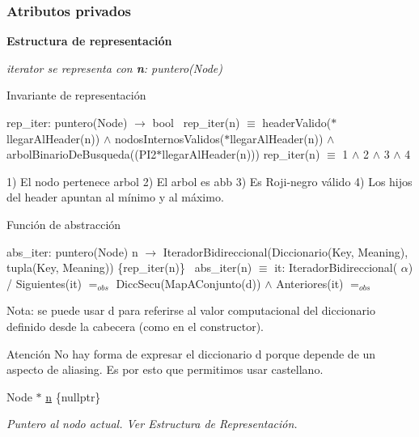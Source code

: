 \subsubsection*{Atributos privados}
\begin{Indent}\textbf{ Estructura de representación}\par
{\em iterator se representa con {\bfseries n}\+: puntero(\+Node)

\begin{DoxyParagraph}{Invariante de representación}

\end{DoxyParagraph}
rep\+\_\+iter\+: puntero(\+Node) $\to$ bool~\newline
rep\+\_\+iter(n) $\equiv$ header\+Valido($\ast$llegar\+Al\+Header(n)) $\land$ nodos\+Internos\+Validos($\ast$llegar\+Al\+Header(n)) $\land$ arbol\+Binario\+De\+Busqueda((P\+I2$\ast$llegar\+Al\+Header(n))) rep\+\_\+iter(n) $\equiv$ 1 $\land$ 2 $\land$ 3 $\land$ 4

1) El nodo pertenece arbol 2) El arbol es abb 3) Es Roji-\/negro válido 4) Los hijos del header apuntan al mínimo y al máximo. \begin{DoxyParagraph}{Función de abstracción}

\end{DoxyParagraph}
abs\+\_\+iter\+: puntero(\+Node) n $\to$ Iterador\+Bidireccional(Diccionario(Key, Meaning), tupla(Key, Meaning)) \{rep\+\_\+iter(n)\}~\newline
abs\+\_\+iter(n) $\equiv$ it\+: Iterador\+Bidireccional( $\alpha$) / Siguientes(it) $=_{obs}$ Dicc\+Secu(\+Map\+A\+Conjunto(d)) $\land$ Anteriores(it) $=_{obs}$

Nota\+: se puede usar {\ttfamily d} para referirse al valor computacional del diccionario definido desde la cabecera (como en el constructor).

\begin{DoxyAttention}{Atención}
No hay forma de expresar el diccionario {\ttfamily d} porque depende de un aspecto de aliasing. Es por esto que permitimos usar castellano. 
\end{DoxyAttention}
}\begin{DoxyCompactItemize}
\item 
Node $\ast$ \hyperlink{classaed2_1_1map_1_1iterator_adf8633ef71bb6c1fc01c0abe8728fd93_adf8633ef71bb6c1fc01c0abe8728fd93}{n} \{nullptr\}
\begin{DoxyCompactList}\small\item\em Puntero al nodo actual. Ver Estructura de Representación. \end{DoxyCompactList}\end{DoxyCompactItemize}
\end{Indent}


